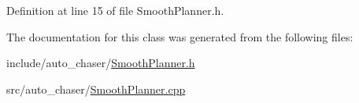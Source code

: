 Definition at line 15 of file Smooth\+Planner.\+h.



The documentation for this class was generated from the following files\+:\begin{DoxyCompactItemize}
\item 
include/auto\+\_\+chaser/\hyperlink{_smooth_planner_8h}{Smooth\+Planner.\+h}\item 
src/auto\+\_\+chaser/\hyperlink{_smooth_planner_8cpp}{Smooth\+Planner.\+cpp}\end{DoxyCompactItemize}
